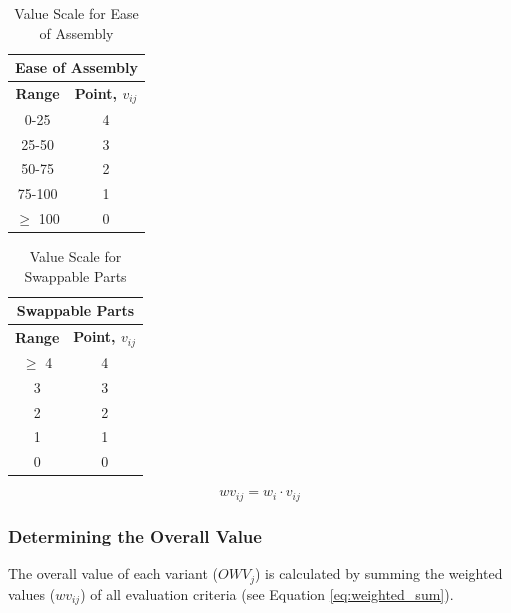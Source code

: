 \begin{table}[H]
    \centering
    \begin{tabular}{|c|c|}
        \hline
        \multicolumn{2}{|c|}{\textbf{Ease of Assembly}} \\ \hline
        \textbf{Range} & \textbf{Point, $v_{ij}$}       \\ \hline
        0-25           & 4                              \\ \hline
        25-50          & 3                              \\ \hline
        50-75          & 2                              \\ \hline
        75-100         & 1                              \\ \hline
        $\geq$ 100     & 0                              \\ \hline
    \end{tabular}
    \caption{Value Scale for Ease of Assembly}
    \label{tab:value_scale_ease_of_assembly}
\end{table}

\begin{table}[H]
    \centering
    \begin{tabular}{|c|c|}
        \hline
        \multicolumn{2}{|c|}{\textbf{Swappable Parts}} \\ \hline
        \textbf{Range} & \textbf{Point, $v_{ij}$}      \\ \hline
        $\geq$ 4       & 4                             \\ \hline
        3              & 3                             \\ \hline
        2              & 2                             \\ \hline
        1              & 1                             \\ \hline
        0              & 0                             \\ \hline
    \end{tabular}
    \caption{Value Scale for Swappable Parts}
    \label{tab:value_scale_swappable_parts}
\end{table}

\begin{equation}
    wv_{ij} = w_{i} \cdot v_{ij}
    \label{eq:weight_calculation}
\end{equation}


\subsubsection{Determining the Overall Value}
The overall value of each variant ($OWV_{j}$) is calculated by summing the weighted values ($wv_{ij}$) of all evaluation criteria (see Equation \ref{eq:weighted_sum}).

